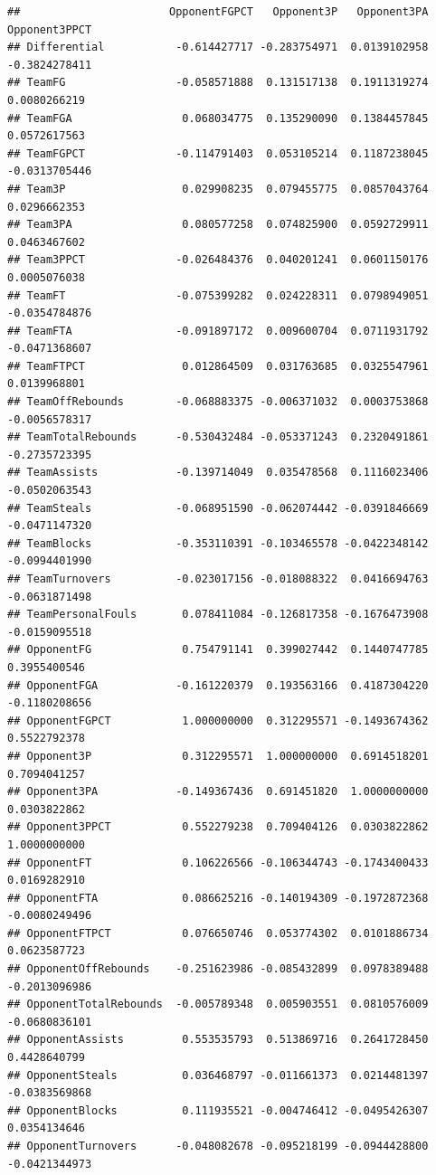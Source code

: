 \documentclass[
]{book}
\begin{document}
\begin{verbatim}
##                       OpponentFGPCT   Opponent3P   Opponent3PA Opponent3PPCT
## Differential           -0.614427717 -0.283754971  0.0139102958 -0.3824278411
## TeamFG                 -0.058571888  0.131517138  0.1911319274  0.0080266219
## TeamFGA                 0.068034775  0.135290090  0.1384457845  0.0572617563
## TeamFGPCT              -0.114791403  0.053105214  0.1187238045 -0.0313705446
## Team3P                  0.029908235  0.079455775  0.0857043764  0.0296662353
## Team3PA                 0.080577258  0.074825900  0.0592729911  0.0463467602
## Team3PPCT              -0.026484376  0.040201241  0.0601150176  0.0005076038
## TeamFT                 -0.075399282  0.024228311  0.0798949051 -0.0354784876
## TeamFTA                -0.091897172  0.009600704  0.0711931792 -0.0471368607
## TeamFTPCT               0.012864509  0.031763685  0.0325547961  0.0139968801
## TeamOffRebounds        -0.068883375 -0.006371032  0.0003753868 -0.0056578317
## TeamTotalRebounds      -0.530432484 -0.053371243  0.2320491861 -0.2735723395
## TeamAssists            -0.139714049  0.035478568  0.1116023406 -0.0502063543
## TeamSteals             -0.068951590 -0.062074442 -0.0391846669 -0.0471147320
## TeamBlocks             -0.353110391 -0.103465578 -0.0422348142 -0.0994401990
## TeamTurnovers          -0.023017156 -0.018088322  0.0416694763 -0.0631871498
## TeamPersonalFouls       0.078411084 -0.126817358 -0.1676473908 -0.0159095518
## OpponentFG              0.754791141  0.399027442  0.1440747785  0.3955400546
## OpponentFGA            -0.161220379  0.193563166  0.4187304220 -0.1180208656
## OpponentFGPCT           1.000000000  0.312295571 -0.1493674362  0.5522792378
## Opponent3P              0.312295571  1.000000000  0.6914518201  0.7094041257
## Opponent3PA            -0.149367436  0.691451820  1.0000000000  0.0303822862
## Opponent3PPCT           0.552279238  0.709404126  0.0303822862  1.0000000000
## OpponentFT              0.106226566 -0.106344743 -0.1743400433  0.0169282910
## OpponentFTA             0.086625216 -0.140194309 -0.1972872368 -0.0080249496
## OpponentFTPCT           0.076650746  0.053774302  0.0101886734  0.0623587723
## OpponentOffRebounds    -0.251623986 -0.085432899  0.0978389488 -0.2013096986
## OpponentTotalRebounds  -0.005789348  0.005903551  0.0810576009 -0.0680836101
## OpponentAssists         0.553535793  0.513869716  0.2641728450  0.4428640799
## OpponentSteals          0.036468797 -0.011661373  0.0214481397 -0.0383569868
## OpponentBlocks          0.111935521 -0.004746412 -0.0495426307  0.0354134646
## OpponentTurnovers      -0.048082678 -0.095218199 -0.0944428800 -0.0421344973

\end{verbatim}
\end{document}
